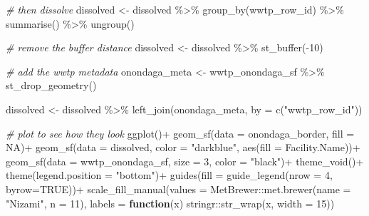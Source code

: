 \documentclass[
]{book}
\newenvironment{Shaded}{\begin{snugshade}}{\end{snugshade}}
\newcommand{\AttributeTok}[1]{\textcolor[rgb]{0.77,0.63,0.00}{#1}}
\newcommand{\CommentTok}[1]{\textcolor[rgb]{0.56,0.35,0.01}{\textit{#1}}}
\newcommand{\ConstantTok}[1]{\textcolor[rgb]{0.00,0.00,0.00}{#1}}
\newcommand{\ControlFlowTok}[1]{\textcolor[rgb]{0.13,0.29,0.53}{\textbf{#1}}}
\newcommand{\DecValTok}[1]{\textcolor[rgb]{0.00,0.00,0.81}{#1}}
\newcommand{\FunctionTok}[1]{\textcolor[rgb]{0.00,0.00,0.00}{#1}}
\newcommand{\NormalTok}[1]{#1}
\newcommand{\OtherTok}[1]{\textcolor[rgb]{0.56,0.35,0.01}{#1}}
\newcommand{\SpecialCharTok}[1]{\textcolor[rgb]{0.00,0.00,0.00}{#1}}
\newcommand{\StringTok}[1]{\textcolor[rgb]{0.31,0.60,0.02}{#1}}
\begin{document}
\begin{Shaded}
\begin{Highlighting}[]
\CommentTok{\# then dissolve}
\NormalTok{dissolved }\OtherTok{\textless{}{-}}\NormalTok{ dissolved }\SpecialCharTok{\%\textgreater{}\%} 
  \FunctionTok{group\_by}\NormalTok{(wwtp\_row\_id) }\SpecialCharTok{\%\textgreater{}\%}
  \FunctionTok{summarise}\NormalTok{() }\SpecialCharTok{\%\textgreater{}\%}
  \FunctionTok{ungroup}\NormalTok{()}

\CommentTok{\# remove the buffer distance}
\NormalTok{dissolved }\OtherTok{\textless{}{-}}\NormalTok{ dissolved }\SpecialCharTok{\%\textgreater{}\%}
  \FunctionTok{st\_buffer}\NormalTok{(}\SpecialCharTok{{-}}\DecValTok{10}\NormalTok{) }

\CommentTok{\# add the wwtp metadata}
\NormalTok{onondaga\_meta }\OtherTok{\textless{}{-}}\NormalTok{ wwtp\_onondaga\_sf }\SpecialCharTok{\%\textgreater{}\%}
  \FunctionTok{st\_drop\_geometry}\NormalTok{() }

\NormalTok{dissolved }\OtherTok{\textless{}{-}}\NormalTok{ dissolved }\SpecialCharTok{\%\textgreater{}\%}
  \FunctionTok{left\_join}\NormalTok{(onondaga\_meta, }\AttributeTok{by =} \FunctionTok{c}\NormalTok{(}\StringTok{"wwtp\_row\_id"}\NormalTok{))}

\CommentTok{\# plot to see how they look}
\FunctionTok{ggplot}\NormalTok{()}\SpecialCharTok{+}
  \FunctionTok{geom\_sf}\NormalTok{(}\AttributeTok{data =}\NormalTok{ onondaga\_border, }\AttributeTok{fill =} \ConstantTok{NA}\NormalTok{)}\SpecialCharTok{+}
  \FunctionTok{geom\_sf}\NormalTok{(}\AttributeTok{data =}\NormalTok{ dissolved, }\AttributeTok{color =} \StringTok{"darkblue"}\NormalTok{, }\FunctionTok{aes}\NormalTok{(}\AttributeTok{fill =} \StringTok{\textasciigrave{}}\AttributeTok{Facility.Name}\StringTok{\textasciigrave{}}\NormalTok{))}\SpecialCharTok{+}
  \FunctionTok{geom\_sf}\NormalTok{(}\AttributeTok{data =}\NormalTok{ wwtp\_onondaga\_sf, }\AttributeTok{size =} \DecValTok{3}\NormalTok{, }\AttributeTok{color =} \StringTok{"black"}\NormalTok{)}\SpecialCharTok{+}
  \FunctionTok{theme\_void}\NormalTok{()}\SpecialCharTok{+}
  \FunctionTok{theme}\NormalTok{(}\AttributeTok{legend.position =} \StringTok{"bottom"}\NormalTok{)}\SpecialCharTok{+}
  \FunctionTok{guides}\NormalTok{(}\AttributeTok{fill =} \FunctionTok{guide\_legend}\NormalTok{(}\AttributeTok{nrow =} \DecValTok{4}\NormalTok{, }\AttributeTok{byrow=}\ConstantTok{TRUE}\NormalTok{))}\SpecialCharTok{+}
  \FunctionTok{scale\_fill\_manual}\NormalTok{(}\AttributeTok{values =}\NormalTok{ MetBrewer}\SpecialCharTok{::}\FunctionTok{met.brewer}\NormalTok{(}\AttributeTok{name =} \StringTok{"Nizami"}\NormalTok{, }\AttributeTok{n =} \DecValTok{11}\NormalTok{),}
                    \AttributeTok{labels =} \ControlFlowTok{function}\NormalTok{(x) stringr}\SpecialCharTok{::}\FunctionTok{str\_wrap}\NormalTok{(x, }\AttributeTok{width =} \DecValTok{15}\NormalTok{))}
\end{Highlighting}
\end{Shaded}
\end{document}
